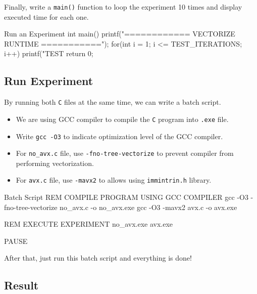 \documentclass[12pt, a4paper]{article}
\begin{document}
            Finally, write a \texttt{main()} function to loop the experiment 10 times and display executed time for each one.
            \begin{codeblock}[minted language=c]{Run an Experiment}
                int main() {
                    printf("============ VECTORIZE RUNTIME ===========\n");
                    for(int i = 1; i <= TEST_ITERATIONS; i++) {
                        printf("TEST %
                    }
                    return 0;
                }
            \end{codeblock}

        \subsection{Run Experiment}

            By running both \texttt{C} files at the same time, we can write a batch script.
            \begin{itemize}
                \item We are using GCC compiler to compile the \texttt{C} program into \texttt{.exe} file.
                \item Write \texttt{gcc -O3} to indicate optimization level of the GCC compiler.
                \item For \texttt{no\_avx.c} file, use \texttt{-fno-tree-vectorize} to prevent compiler from performing vectorization.
                \item For \texttt{avx.c} file, use \texttt{-mavx2} to allows using \texttt{immintrin.h} library.
            \end{itemize}
            \begin{codeblock}[minted language=bat]{Batch Script}
                REM COMPILE PROGRAM USING GCC COMPILER
                gcc -O3 -fno-tree-vectorize no_avx.c -o no_avx.exe
                gcc -O3 -mavx2 avx.c -o avx.exe

                REM EXECUTE EXPERIMENT
                no_avx.exe
                avx.exe

                PAUSE
            \end{codeblock}

            After that, just run this batch script and everything is done!

    \pagebreak

        \subsection{Result}
\end{document}
